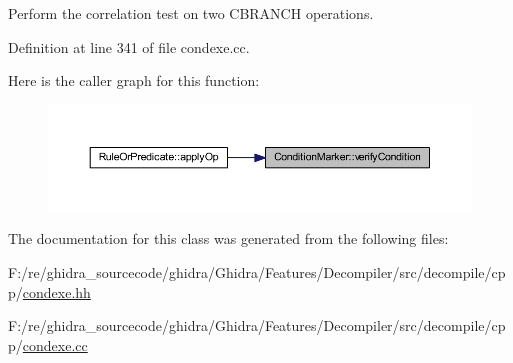 Perform the correlation test on two C\+B\+R\+A\+N\+CH operations. 



Definition at line 341 of file condexe.\+cc.

Here is the caller graph for this function\+:
\nopagebreak
\begin{figure}[H]
\begin{center}
\leavevmode
\includegraphics[width=350pt]{class_condition_marker_a46df93505aa04dd2d8b77239b272092f_icgraph}
\end{center}
\end{figure}


The documentation for this class was generated from the following files\+:\begin{DoxyCompactItemize}
\item 
F\+:/re/ghidra\+\_\+sourcecode/ghidra/\+Ghidra/\+Features/\+Decompiler/src/decompile/cpp/\mbox{\hyperlink{condexe_8hh}{condexe.\+hh}}\item 
F\+:/re/ghidra\+\_\+sourcecode/ghidra/\+Ghidra/\+Features/\+Decompiler/src/decompile/cpp/\mbox{\hyperlink{condexe_8cc}{condexe.\+cc}}\end{DoxyCompactItemize}
